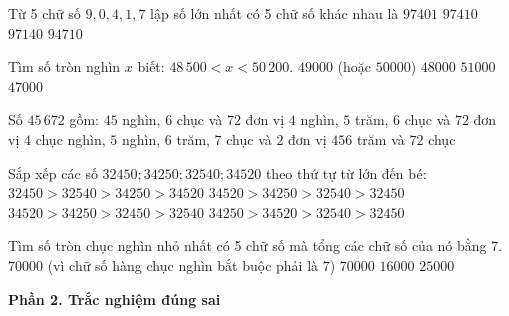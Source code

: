 \begin{ex} %
Từ 5 chữ số $9, 0, 4, 1, 7$ lập số lớn nhất có 5 chữ số khác nhau là
\choice
{$97401$}
{\True $97410$}
{$97140$}
{$94710$}
\end{ex}

\begin{ex} %
Tìm số tròn nghìn $x$ biết: $48\,500 < x < 50\,200$.
\choice
{\True $49000$ (hoặc $50000$)}
{$48000$}
{$51000$}
{$47000$}
\end{ex}

\begin{ex} %
Số $45\,672$ gồm:
\choice
{$45$ nghìn, $6$ chục và $72$ đơn vị}
{$4$ nghìn, $5$ trăm, $6$ chục và $72$ đơn vị}
{\True $4$ chục nghìn, $5$ nghìn, $6$ trăm, $7$ chục và $2$ đơn vị}
{$456$ trăm và $72$ chục}
\end{ex}

\begin{ex} %
Sắp xếp các số $32450; 34250; 32540; 34520$ theo thứ tự từ lớn đến bé:
\choice
{$32450 > 32540 > 34250 > 34520$}
{\True $34520 > 34250 > 32540 > 32450$}
{$34520 > 34250 > 32450 > 32540$}
{$34250 > 34520 > 32540 > 32450$}
\end{ex}

\begin{ex} %
Tìm số tròn chục nghìn nhỏ nhất có 5 chữ số mà tổng các chữ số của nó bằng 7.
\choice
{\True $70000$ (vì chữ số hàng chục nghìn bắt buộc phải là $7$)}
{$70000$}
{$16000$}
{$25000$}
\end{ex}

\textbf{Phần 2. Trắc nghiệm đúng sai}

